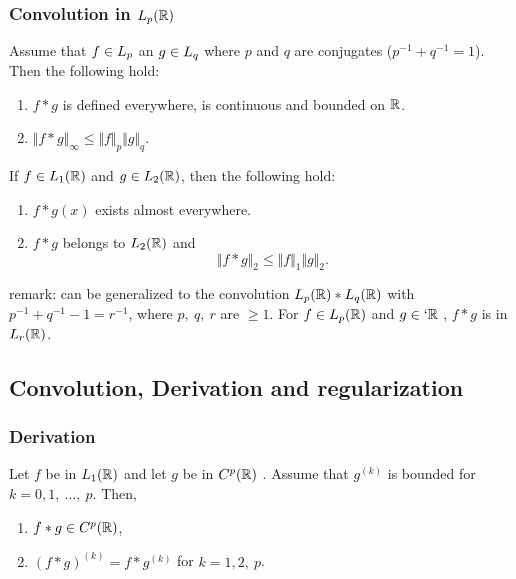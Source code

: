 \begin{frame}
\frametitle{Convolution in $L_{p}(\mathbb{R})$}
\begin{theorem}
Assume that $f\in L_{p}$ an $g\in L_{q}$ where $p$ and $q$ are conjugates ($p^{-1} + q^{-1}=1$).
Then the following hold:
\begin{enumerate}[label=(\roman*)]
\item $f*g$  is defined everywhere, is continuous  and  bounded on $\mathbb{R}$.
\item $\Vert f*g\Vert_{\infty}\leq\Vert f\Vert_{p}\Vert g\Vert_{q}$.
\end{enumerate}
\end{theorem}
\end{frame}



\begin{frame}
\begin{theorem}
If $f\in L_1(\mathbb{R})$ and $g\in L_2(\mathbb{R})$, then the following hold:
\begin{enumerate}[label=(\roman*)]
\item $f*g(x)$ exists almost everywhere.
\item $f*g$ belongs to  $L_2(\mathbb{R})$ and
$$
\Vert f*g\Vert_{2}\leq\Vert f\Vert_{1}\Vert g\Vert_{2} .
$$
\end{enumerate}
\end{theorem}
\alert{remark:}  can be generalized to the convolution $L_{p}(\mathbb{R})*L_{q}(\mathbb{R})$ with $p^{-1}+q^{-1}-1=r^{-1}$, where $p,\ q,\ r$ are $\geq 1$. For $f\in L_{p}(\mathbb{R})$ and $ g\in \lq{\rset}$ , $f*g$ is in $L_{r}(\mathbb{R})$.
\end{frame}



\subsection{Convolution, Derivation and regularization}

\begin{frame}
\frametitle{Derivation}
\begin{theorem}
Let $f$ be in $L_1(\mathbb{R})$ and let $g$ be in $C^{p}(\mathbb{R})$ .  Assume that $g^{(k)}$ is bounded for $k=0,1,\ \ldots,\ p$. Then,
\begin{enumerate}[label=(\roman*)]
\item $ f*g\in C^{p}(\mathbb{R})$,
\item  $(f*g)^{(k)}=f*g^{(k)}$  for $k=1,2,\ p$.
\end{enumerate}
\end{theorem}
\end{frame}

